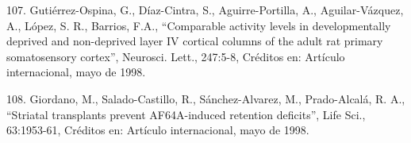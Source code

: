 107. Gutiérrez-Ospina, G., Díaz-Cintra, S., Aguirre-Portilla, A., Aguilar-Vázquez, A., López, S. R., Barrios, F.A., “Comparable 
activity levels in developmentally deprived and non-deprived layer IV cortical columns of the adult rat primary somatosensory 
cortex”, Neurosci. Lett., 247:5-8, Créditos en: Artículo internacional, mayo de 1998.

108. Giordano, M., Salado-Castillo, R., Sánchez-Alvarez, M., Prado-Alcalá, R. A., “Striatal transplants prevent AF64A-induced 
retention deficits”, Life Sci., 63:1953-61, Créditos en: Artículo internacional, mayo de 1998.


